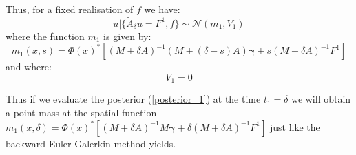 \documentclass{article}
\theoremstyle{definition}
\theoremstyle{remark}
\theoremstyle{remark}
\begin{document}
Thus, for a fixed realisation of $f$ we have:
\begin{equation}
    \label{posterior_1}
    u|\{\tilde{A}_{\delta}u=F^{1},f\}\sim\mathcal{N}(m_{1},V_{1})
\end{equation}
where the function $m_{1}$ is given by:
\begin{equation}
    m_{1}(x,s)=\Phi(x)^{*}[(M+\delta A)^{-1}(M+(\delta-s)A)\boldsymbol{\gamma}+s (M+\delta A)^{-1}F^{1}]
\end{equation}
and where:
\begin{equation*}
    V_{1}=0
\end{equation*}

Thus if we evaluate the posterior (\ref{posterior_1}) at the time $t_{1}=\delta$ we will obtain a point mass at the spatial function
$m_{1}(x,\delta)=\Phi(x)^{*}[(M+\delta A)^{-1}M\boldsymbol{\gamma}+\delta (M+\delta A)^{-1}F^{1}]$ just like the backward-Euler Galerkin method yields.
\end{document}
